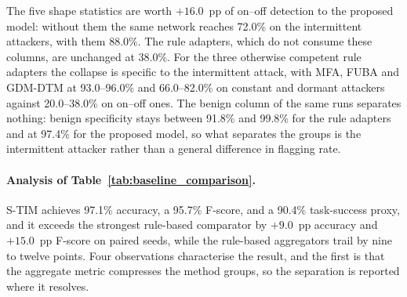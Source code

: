 \documentclass[notspecified,article,submit,moreauthors]{Definitions/mdpi}
\begin{document}
\begin{table}[!htbp]
  \centering
  \caption{Detection rate by \emph{method group} and attack strategy, 30\% malicious, 15 UAVs, mean over 50 seeds. The first row spans the five rule-based aggregators, whose range is wide only because GALTrust and AHP-Entropy are weak on every pattern; the two following rows are the proposed model with and without the five temporal-shape statistics. Bold marks the proposed model's advantage.}
  \label{tab:method_class}
  \footnotesize
  \setlength{\tabcolsep}{6pt}
  \renewcommand{\arraystretch}{1.15}
\par
\vspace{2pt}
\raggedright\scriptsize
The five shape statistics are worth $+16.0$~pp of on--off detection to the proposed model: without them the same network reaches 72.0\% on the intermittent attackers, with them 88.0\%. The rule adapters, which do not consume these columns, are unchanged at 38.0\%. For the three otherwise competent rule adapters the collapse is specific to the intermittent attack, with MFA, FUBA and GDM-DTM at 93.0--96.0\% and 66.0--82.0\% on constant and dormant attackers against 20.0--38.0\% on on--off ones. The benign column of the same runs separates nothing: benign specificity stays between 91.8\% and 99.8\% for the rule adapters and at 97.4\% for the proposed model, so what separates the groups is the intermittent attacker rather than a general difference in flagging rate.
\end{table}

\paragraph{Analysis of Table~\ref{tab:baseline_comparison}.}
S-TIM achieves 97.1\% accuracy, a 95.7\% F-score, and a 90.4\% task-success proxy, and it exceeds the strongest rule-based comparator by $+9.0$~pp accuracy and $+15.0$~pp F-score on paired seeds, while the rule-based aggregators trail by nine to twelve points. Four observations characterise the result, and the first is that the aggregate metric compresses the method groups, so the separation is reported where it resolves.
\end{document}
